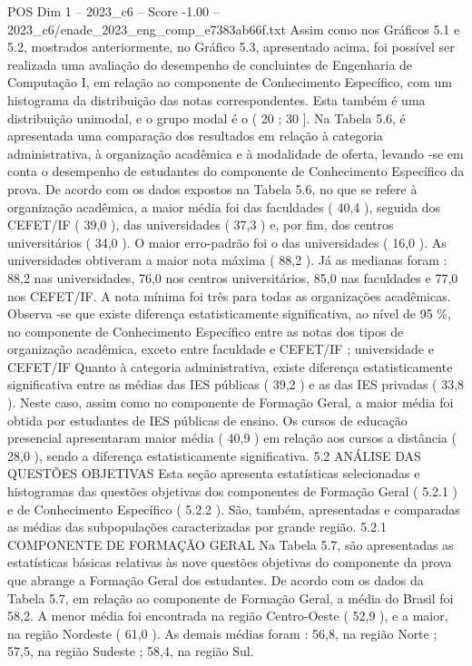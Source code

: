 \begin{textsample}{POS Dim 1 – 2023\_c6 – Score -1.00 – 2023\_c6/enade\_2023\_eng\_comp\_e7383ab66f.txt}
Assim como nos Gráficos 5.1 e 5.2, mostrados anteriormente, no Gráfico 5.3, apresentado acima, foi possível ser realizada uma avaliação do desempenho de concluintes de Engenharia de Computação I, em relação ao componente de Conhecimento Específico, com um histograma da distribuição das notas correspondentes.
Esta também é uma distribuição unimodal, e o grupo modal é o ( 20 ; 30 ].
Na Tabela 5.6, é apresentada uma comparação dos resultados em relação à categoria administrativa, à organização acadêmica e à modalidade de oferta, levando -se em conta o desempenho de estudantes do componente de Conhecimento Específico da prova.
De acordo com os dados expostos na Tabela 5.6, no que se refere à organização acadêmica, a maior média foi das faculdades ( 40,4 ), seguida dos CEFET/IF ( 39,0 ), das universidades ( 37,3 ) e, por fim, dos centros universitários ( 34,0 ).
O maior erro-padrão foi o das universidades ( 16,0 ).
As universidades obtiveram a maior nota máxima ( 88,2 ).
Já as medianas foram : 88,2 nas universidades, 76,0 nos centros universitários, 85,0 nas faculdades e 77,0 nos CEFET/IF.
A nota mínima foi três para todas as organizações acadêmicas.
Observa -se que existe diferença estatisticamente significativa, ao nível de 95 \%, no componente de Conhecimento Específico entre as notas dos tipos de organização acadêmica, exceto entre faculdade e CEFET/IF ; universidade e CEFET/IF Quanto à categoria administrativa, existe diferença estatisticamente significativa entre as médias das IES públicas ( 39,2 ) e as das IES privadas ( 33,8 ).
Neste caso, assim como no componente de Formação Geral, a maior média foi obtida por estudantes de IES públicas de ensino.
Os cursos de educação presencial apresentaram maior média ( 40,9 ) em relação aos cursos a distância ( 28,0 ), sendo a diferença estatisticamente significativa. 5.2 ANÁLISE DAS QUESTÕES OBJETIVAS Esta seção apresenta estatísticas selecionadas e histogramas das questões objetivas dos componentes de Formação Geral ( 5.2.1 ) e de Conhecimento Específico ( 5.2.2 ).
São, também, apresentadas e comparadas as médias das subpopulações caracterizadas por grande região. 5.2.1 COMPONENTE DE FORMAÇÃO GERAL Na Tabela 5.7, são apresentadas as estatísticas básicas relativas às nove questões objetivas do componente da prova que abrange a Formação Geral dos estudantes.
De acordo com os dados da Tabela 5.7, em relação ao componente de Formação Geral, a média do Brasil foi 58,2.
A menor média foi encontrada na região Centro-Oeste ( 52,9 ), e a maior, na região Nordeste ( 61,0 ).
As demais médias foram : 56,8, na região Norte ; 57,5, na região Sudeste ; 58,4, na região Sul.

\end{textsample}
